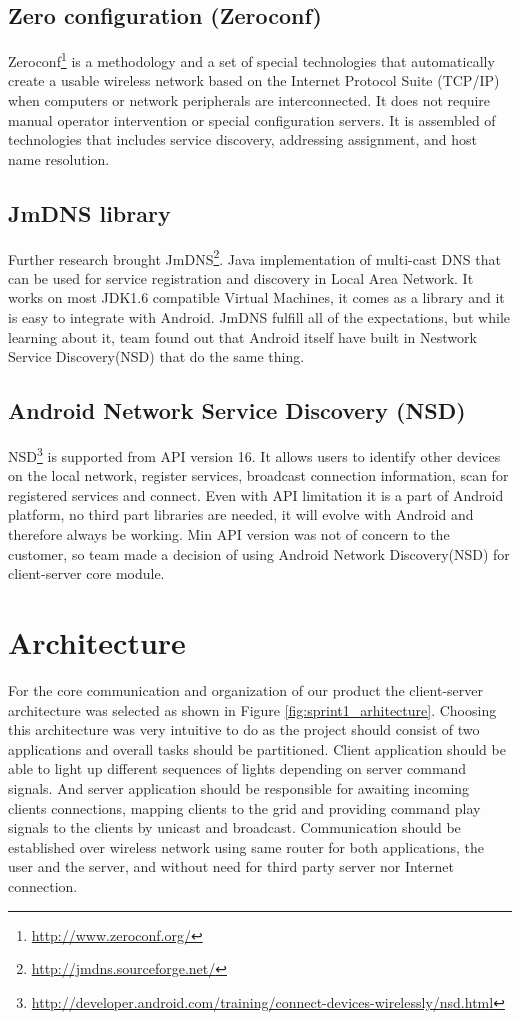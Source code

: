 \subsection {Zero configuration (Zeroconf)}
Zeroconf\footnote{\url{http://www.zeroconf.org/}} is a methodology and a set of special technologies that automatically create a usable wireless network based on the Internet Protocol Suite (TCP/IP) when computers or network peripherals are interconnected. 
It does not require manual operator intervention or special configuration servers.
It is assembled of technologies that includes service discovery, addressing assignment, and host name resolution.


\subsection{JmDNS library}
\label{subsection:jmdns_desc}
Further research brought JmDNS\footnote{\url{http://jmdns.sourceforge.net/}}. 
Java implementation of multi-cast DNS that can be used for service registration and discovery in Local Area Network. 
It works on most JDK1.6 compatible Virtual Machines, it comes as a library and it is easy to integrate with Android. 
JmDNS fulfill all of the expectations, but while learning about it, team found out that Android itself have built in Nestwork Service Discovery(NSD) that do the same thing.

\subsection{Android Network Service Discovery (NSD)}
NSD\footnote{\url{http://developer.android.com/training/connect-devices-wirelessly/nsd.html}} is supported from API version 16. 
It allows users to identify other devices on the local network, register services, broadcast connection information, scan for registered services and connect.
Even with API limitation it is a part of Android platform, no third part libraries are needed, it will evolve with Android and therefore always be working.
Min API version was not of concern to the customer, so team made a decision of using Android Network Discovery(NSD) for client-server core module.

\section{Architecture}
For the core communication and organization of our product the client-server architecture was selected as shown in Figure \ref{fig:sprint1_arhitecture}.
Choosing this architecture was very intuitive to do as the project should consist of two applications and overall tasks should be partitioned. 
Client application should be able to light up different sequences of lights depending on server command signals.
And server application should be responsible for awaiting incoming clients connections, mapping clients to the grid and providing command play signals to the clients by unicast and broadcast.
Communication should be established over wireless network using same router for both applications, the user and the server, and without need for third party server nor Internet connection.


